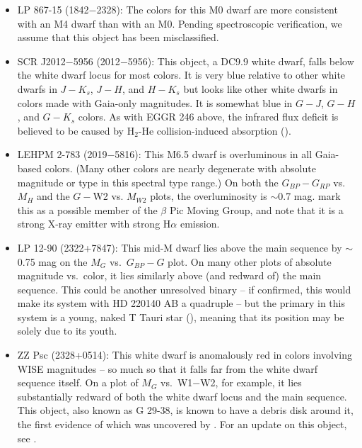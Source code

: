 \documentclass[twocolumn,tighten,twocolappendix]{aastex631}
\begin{document}
\begin{itemize}
\item LP 867-15 (1842$-$2328): The colors for this M0 dwarf are more consistent with an M4 dwarf than with an M0. Pending spectroscopic verification, we assume that this object has been misclassified.

\item SCR J2012$-$5956 (2012$-$5956): This object, a DC9.9 white dwarf, falls below the white dwarf locus for most colors. It is very blue relative to other white dwarfs in $J-K_s$, $J-H$, and $H-K_s$ but looks like other white dwarfs in colors made with Gaia-only magnitudes. It is somewhat blue in $G-J$, $G-H$, and $G-K_s$ colors. As with EGGR 246 above, the infrared flux deficit is believed
to be caused by H$_2$-He collision-induced absorption (\citealt{giammichele2012}).

\item LEHPM 2-783 (2019$-$5816): This M6.5 dwarf is overluminous in all Gaia-based colors. (Many other colors are nearly degenerate with absolute magnitude or type in this spectral type range.) On both the $G_{BP}-G_{RP}$ vs.\ $M_H$ and the $G-$W2 vs. $M_{W2}$ plots, the overluminosity is $\sim$0.7 mag. \cite{ujjwal2020} mark this as a possible member of the $\beta$ Pic Moving Group, and \cite{riaz2006} note that it is a strong X-ray emitter with strong H$\alpha$ emission.

\item LP 12-90 (2322+7847): This mid-M dwarf lies above the main sequence by $\sim$0.75 mag on the $M_G$ vs.\ $G_{BP}-G$ plot. On many other plots of absolute magnitude vs.\ color, it lies similarly above (and redward of) the main sequence.  This could be another unresolved binary -- if confirmed, this would make its system with HD 220140 AB a quadruple -- but the primary in this system is a young, naked T Tauri star (\citealt{makarov2007}), meaning that its position may be solely due to its youth.

\item ZZ Psc (2328+0514): This white dwarf is anomalously red in colors involving WISE magnitudes -- so much so that it falls far from the white dwarf sequence itself. On a plot of $M_G$ vs.\ W1$-$W2, for example, it lies substantially redward of both the white dwarf locus and the main sequence. This object, also known as G 29-38, is known to have a debris disk around it, the first evidence of which was uncovered by \cite{zuckerman1987}. For an update on this object, see \cite{cunningham2022}.

\end{itemize}
\end{document}
